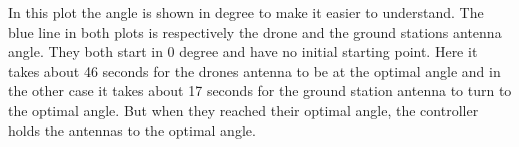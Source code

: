 In this plot the angle is shown in degree to make it easier to understand. The blue line in both plots is respectively the drone and the ground stations antenna angle. They both start in 0 degree and have no initial starting point. Here it takes about 46 seconds for the drones antenna to be at the optimal angle and in the other case it takes about 17 seconds for the ground station antenna to turn to the optimal angle. But when they reached their optimal angle, the controller holds the antennas to the optimal angle. 
\newpage
